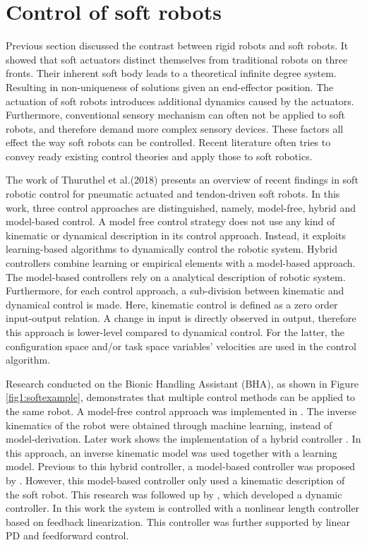 \section{Control of soft robots}

Previous section discussed the contrast between rigid robots and soft robots. It showed that soft actuators distinct themselves from traditional robots on three fronts. Their inherent soft body leads to a theoretical infinite degree system. Resulting in non-uniqueness of solutions given an end-effector position. The actuation of soft robots introduces additional dynamics caused by the actuators. Furthermore, conventional sensory mechanism can often not be applied to soft robots, and therefore demand more complex sensory devices. These factors all effect the way soft robots can be controlled. Recent literature often tries to convey ready existing control theories and apply those to soft robotics.

The work of Thuruthel et al.(2018) \cite{george2018control} presents an overview of recent findings in soft robotic control for pneumatic actuated and tendon-driven soft robots. In this work, three control approaches are distinguished, namely, model-free, hybrid and model-based control. A model free control strategy does not use any kind of kinematic or dynamical description in its control approach. Instead, it exploits learning-based algorithms to dynamically control the robotic system. Hybrid controllers combine learning or empirical elements with a model-based approach. The model-based controllers rely on a analytical description of robotic system. Furthermore, for each control approach, a sub-division between kinematic and dynamical control is made. Here, kinematic control is defined as a zero order input-output relation. A change in input is directly observed in output, therefore this approach is lower-level compared to dynamical control. For the latter, the configuration space and/or task space variables' velocities are used in the control algorithm. 


Research conducted on the Bionic Handling Assistant (BHA), as shown in Figure \ref{fig1:softexample}, demonstrates that multiple control methods can be applied to the same robot. A model-free control approach was implemented in \cite{rolf2013efficient}. The inverse kinematics of the robot were obtained through machine learning, instead of model-derivation. Later work shows the implementation of a hybrid controller \cite{reinhart2017hybrid}. In this approach, an inverse kinematic model was used together with a learning model. Previous to this hybrid controller, a model-based controller was proposed by \cite{mahl2014bhakin}. However, this model-based controller only used a kinematic description of the soft robot. This research was followed up by \cite{falkenhahn2016dynamic}, which developed a dynamic controller. In this work the system is controlled with a nonlinear length controller based on feedback linearization. This controller was further supported by linear PD and feedforward control. 

